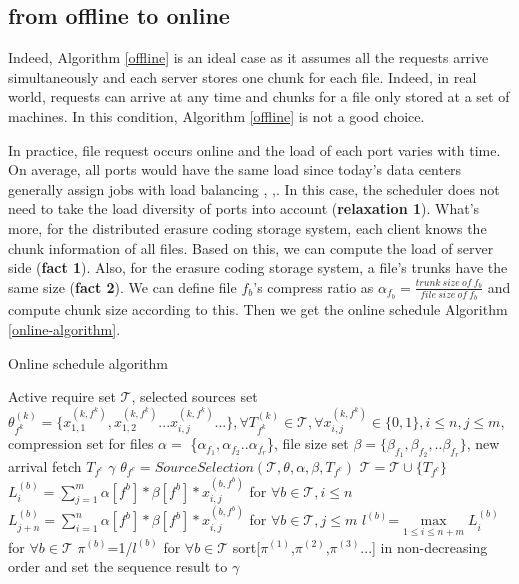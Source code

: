 \documentclass{IEEEtran}
\begin{document}
\subsection{from offline to online}
Indeed, Algorithm \ref{offline} is an ideal case as it assumes all the requests arrive simultaneously and each server stores one chunk for each file.
Indeed, in real world, requests can arrive at any time and chunks for a file only stored at a set of machines. 
In this condition, Algorithm \ref{offline} is not a good choice.

 In practice, file request occurs online and the load of each port varies with time. 
 On average, all ports would have the same load since today's data centers generally assign jobs with load balancing \cite{dogar2014decentralized}, \cite{luo2016towards},\cite{dean2008mapreduce}. 
In this case, the scheduler does not need to take the load diversity of ports into account (\textbf{relaxation 1})\cite{luo2016towards}.
 What's more, for the distributed erasure coding storage system, each client knows the chunk information of all
 files.
 Based on this, we can compute the load of server side (\textbf{fact 1}).
  Also, for the erasure coding storage system, a file's trunks have the same size (\textbf{fact 2}).
  We can define  file $f_b$'s compress ratio as $\alpha_{f_b}=\frac{trunk\ size \ of \ f_b}{file \ size \ of \ f_b}$ and compute chunk size according to this.
Then we get the online schedule Algorithm \ref{online-algorithm}.
 \begin{algorithm} 
 \caption{Online schedule algorithm}
 \begin{algorithmic}[1]\label{online-algorithm}
 \renewcommand{\algorithmicrequire}{\textbf{Input: }}
 \renewcommand{\algorithmicensure}{\textbf{Output:}}
 \REQUIRE Active require set $\mathcal{T}$, selected sources set $\theta_{f^k}^{(k)}=\{x_{1,1} ^{(k,f^k)},x_{1,2} ^{(k,f^k)}...x_{i,j}^{(k,f^k)}...\} ,\forall T^{(k)}_{f^k} \in \mathcal{T},\forall x_{i,j}^{(k,f^k)} \in \{0,1\},i \le n,j \le m$,  compression set for files $\alpha=$ \{$\alpha_{f_1},\alpha_{f_2}..\alpha_{f_r}$\}, file size set $\beta=\{\beta_{f_1},\beta_{f_2},..\beta_{f_r}\}$, new arrival fetch  $T_{f^c}$
 \ENSURE  $\gamma$
 \STATE   $\theta_{f^c}= SourceSelection(\mathcal{T},\theta,\alpha,\beta,T_{f^c})$
 \STATE $\mathcal{T} = \mathcal{T} \cup \{T_{f^c}\}$
%
  \STATE $L_i^{(b)}= \sum_{j=1}^{m}\alpha[f^b]*\beta[f^b]*x_{i,j}^{(b,f^b)}$ for $\forall b \in \mathcal{T},i \le n$
   \STATE $L_{j+n}^{(b)}= \sum_{i=1}^n\alpha[f^b]*\beta[f^b]*x_{i,j}^{(b,f^b)}$ for $\forall b \in \mathcal{T},j \le m$
    \STATE  $l^{(b)}$=$ \max \limits_{1 \le i \le n+m}L_i^{(b)}$ for $\forall b \in\mathcal{T}$ 
     \STATE  $\pi^{(b)}$=1/$l^{(b)}$ for $\forall b \in \mathcal{T}$ 
     \STATE sort[$\pi^{(1)}$,$\pi^{(2)}$,$\pi^{(3)}$...] in non-decreasing order and set the sequence result to $\gamma$
     \end{algorithmic} 
 \end{algorithm}
 
\end{document}
